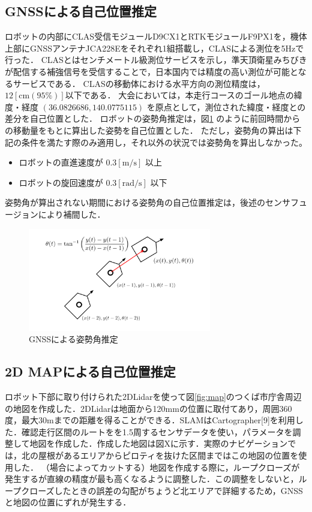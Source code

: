 \documentclass[platex,dvipdfmx]{rbproceedings}
\begin{document}
\subsection{GNSSによる自己位置推定}
ロボットの内部にCLAS受信モジュールD9CX1とRTKモジュールF9PX1を，機体上部にGNSSアンテナJCA228Eをそれぞれ1組搭載し，CLASによる測位を5Hzで行った．
CLASとはセンチメートル級測位サービスを示し，準天頂衛星みちびきが配信する補強信号を受信することで，日本国内では精度の高い測位が可能となるサービスである．
CLASの移動体における水平方向の測位精度は，$12[\mathrm{cm} (95 \%)]$以下である．
大会においては，本走行コースのゴール地点の緯度・経度 $(36.0826686 ,140.0775115)$ を原点として，測位された緯度・経度との差分を自己位置とした．
ロボットの姿勢角推定は，図\ref{fig:gnss_orientaiton} のように前回時間からの移動量をもとに算出した姿勢を自己位置とした．
ただし，姿勢角の算出は下記の条件を満たす際のみ適用し，それ以外の状況では姿勢角を算出しなかった。
\begin{itemize}
    \item ロボットの直進速度が $0.3[\mathrm{m/s}]$ 以上
    \item ロボットの旋回速度が $0.3[\mathrm{rad/s}]$ 以下
\end{itemize}
姿勢角が算出されない期間における姿勢角の自己位置推定は，後述のセンサフュージョンにより補間した．



\begin{figure}[h]
    \centering   
    \includegraphics[keepaspectratio,width=80mm]{fig/gnss_orientation.png}
    \caption{GNSSによる姿勢角推定}
    \label{fig:gnss_orientaiton}
\end{figure}

\subsection{2D MAPによる自己位置推定}
ロボット下部に取り付けられた2DLidarを使って図\ref{fig:map}のつくば市庁舎周辺の地図を作成した．2DLidarは地面から120mmの位置に取付てあり，周囲360度，最大30mまでの距離を得ることができる．SLAMはCartographer[9]を利用した．確認走行区間のルートをを1.5周するセンサデータを使い，パラメータを調整して地図を作成した．作成した地図は図Xに示す．実際のナビゲーションでは，北の屋根があるエリアからピロティを抜けた区間まではこの地図の位置を使用した．
（場合によってカットする）地図を作成する際に，ループクローズが発生するが直線の精度が最も高くなるように調整した．この調整をしないと，ループクローズしたときの誤差の勾配がちょうど北エリアで詳細するため，GNSSと地図の位置にずれが発生する．
\end{document}
